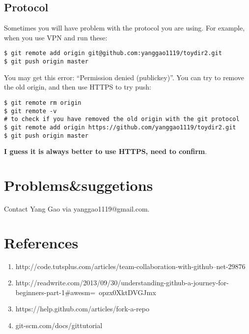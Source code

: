 \documentclass{article} %
\newcommand{\q}[1]{``#1''}
\begin{document}
\subsection{Protocol}

Sometimes you will have problem with the protocol you are using. For example, when you use VPN and run these:

\begin{lstlisting}
$ git remote add origin git@github.com:yanggao1119/toydir2.git
$ git push origin master
\end{lstlisting}

You may get this error: \q{Permission denied (publickey)}. You can try to remove the old origin, and then use HTTPS to try push:

\begin{lstlisting}
$ git remote rm origin
$ git remote -v 
# to check if you have removed the old origin with the git protocol
$ git remote add origin https://github.com/yanggao1119/toydir2.git
$ git push origin master  
\end{lstlisting}

\textbf{I guess it is always better to use HTTPS, need to confirm}.

\section{Problems\&suggetions}
Contact Yang Gao via yanggao1119@gmail.com.

\section{References}

\begin{enumerate}
\item http://code.tutsplus.com/articles/team-collaboration-with-github--net-29876
\item http://readwrite.com/2013/09/30/understanding-github-a-journey-for-beginners-part-1\#awesm=~opzx0XktDVGJmx
\item https://help.github.com/articles/fork-a-repo
\item git-scm.com/docs/gittutorial
\end{enumerate}
\end{document}
